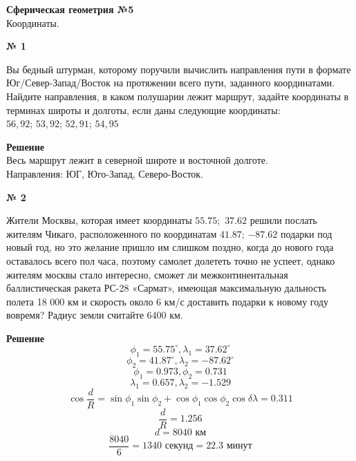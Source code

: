 


    \begin{center}
        \textbf{Сферическая геометрия №5}\\
        Координаты.
    \end{center}

    \begin{center}
        \textbf{№ 1}
    \end{center}

    Вы бедный штурман, которому поручили вычислить направления пути в формате Юг/Север-Запад/Восток
    на протяжении всего пути, заданного координатами.
    Найдите направления, в каком полушарии лежит маршрут, задайте координаты в терминах широты и долготы, если даны следующие координаты:\\
    $56, 92$; $53, 92$; $52, 91$; $54, 95$

    \textbf{Решение}\\

    Весь маршрут лежит в северной широте и восточной долготе.\\
    Направления: ЮГ, Юго-Запад, Северо-Восток.\\


    \begin{center}
        \textbf{№ 2}
    \end{center}

    Жители Москвы, которая имеет координаты $55.75;$ $37.62$ решили послать
    жителям Чикаго, расположенного по координатам $41.87$; $-87.62$ подарки под новый год,
    но это желание пришло им слишком поздно, когда до нового года оставалось всего пол часа,
    поэтому самолет долететь точно не успеет, однако жителям москвы стало интересно,
    сможет ли межконтинентальная баллистическая ракета РС-28 «Сармат», имеющая максимальную дальность
    полета 18 000 км и скорость около 6 км/с доставить подарки к новому году вовремя?
    Радиус земли считайте 6400 км.

    \textbf{Решение}\\

    \[
        \phi_1 = 55.75^{\circ}, \lambda_1 = 37.62^{\circ}
    \]
    \[
        \phi_2 = 41.87^{\circ}, \lambda_2 = -87.62^{\circ}
    \]
    \[
        \phi_1 = 0.973, \phi_2 = 0.731
    \]
    \[
        \lambda_1 = 0.657, \lambda_2 = -1.529
    \]
    \[
        \cos \frac{d}{R} = \sin \phi_1 \sin \phi_2 + \cos\phi_1\cos\phi_2 \cos\delta\lambda =
        0.311
    \]
    \[
        \frac{d}{R} = 1.256
    \]
    \[
        d = 8040 \text{ км}
    \]
    \[
        \frac{8040}{6} = 1340 \text{ секунд} = 22.3 \text{ минут}
    \]

